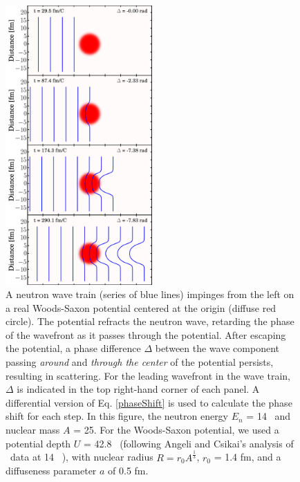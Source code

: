 \begin{figure}[tb]
    \centering
    \includegraphics[width=0.5\textwidth]{figures/phaseShiftStillsFigure.png}
    \caption[A illustration of the nuclear Ramsauer effect]
    {
        A neutron wave train (series of
        blue lines) impinges from the left on a real Woods-Saxon
        potential centered at the origin (diffuse red circle). The potential
        refracts the neutron wave,
        retarding the phase of the wavefront as it passes through the
        potential. After escaping the potential, a phase difference $\Delta$ between
        the wave component passing \textit{around} and \textit{through the center}
        of the potential persists, resulting in scattering.
        For the leading wavefront in the wave train, $\Delta$ is indicated in
        the top right-hand corner of each panel. A differential version of
        Eq. \ref{phaseShift} is used to
        calculate the phase shift for each step. In this figure, the neutron
        energy $E_{n}$ = 14 \mega\electronvolt\ and nuclear mass $A$ = 25. For the Woods-Saxon potential,
        we used a potential depth $U$ = 42.8 \mega\electronvolt\ (following Angeli and Csikai's analysis
        of \tot\ data at 14 \mega\electronvolt\ \cite{Angeli1970}), with nuclear radius $R = 
        r_{0}A^{\frac{1}{3}}$, $r_{0}$ = 1.4 fm, and a diffuseness parameter
        $a$ of 0.5 fm.
    }
    \label{RamsauerPhaseShiftFigure}
\end{figure}


